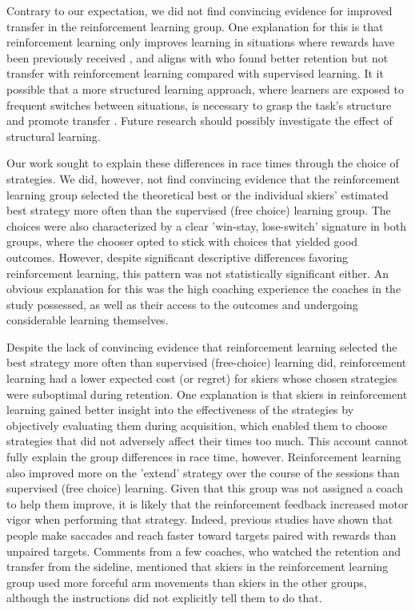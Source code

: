 \documentclass[pdflatex,sn-mathphys-num]{sn-jnl}%
\theoremstyle{thmstyleone}%
\theoremstyle{thmstyletwo}%
\theoremstyle{thmstylethree}%
\begin{document}
Contrary to our expectation, we did not find convincing evidence for improved transfer in the reinforcement learning group. One explanation for this is that reinforcement learning only improves learning in situations where rewards have been previously received \cite{robertson_memory_2018}, and aligns with \textcite{hasson_reinforcement_2015} who found better retention but not transfer with reinforcement learning compared with supervised learning. It it possible that a more structured learning approach, where learners are exposed to frequent switches between situations, is necessary to grasp the task's structure and promote transfer \cite{braun_structure_2010}. Future research should possibly investigate the effect of structural learning. 

Our work sought to explain these differences in race times through the choice of strategies. We did, however, not find convincing evidence that the reinforcement learning group selected the theoretical best or the individual skiers' estimated best strategy more often than the supervised (free choice) learning group. The choices were also characterized by a clear 'win-stay, lose-switch' signature in both groups, where the chooser opted to stick with choices that yielded good outcomes. However, despite significant descriptive differences favoring reinforcement learning, this pattern was not statistically significant either. An obvious explanation for this was the high coaching experience the coaches in the study possessed, as well as their access to the outcomes and undergoing considerable learning themselves. 

Despite the lack of convincing evidence that reinforcement learning selected the best strategy more often than supervised (free-choice) learning did, reinforcement learning had a lower expected cost (or regret) for skiers whose chosen strategies were suboptimal during retention. One explanation is that skiers in reinforcement learning gained better insight into the effectiveness of the strategies by objectively evaluating them during acquisition, which enabled them to choose strategies that did not adversely affect their times too much. This account cannot fully explain the group differences in race time, however. Reinforcement learning also improved more on the 'extend' strategy over the course of the sessions than supervised (free choice) learning. Given that this group was not assigned a coach to help them improve, it is likely that the reinforcement feedback increased motor vigor \cite{shadmehr_vigor_2020, pietro_mazzoni_why_2007, niv_normative_2006} when performing that strategy. Indeed, previous studies have shown that people make saccades \cite{takikawa_modulation_2002} and reach faster \cite{summerside_vigor_2018} toward targets paired with rewards than unpaired targets. Comments from a few coaches, who watched the retention and transfer from the sideline, mentioned that skiers in the reinforcement learning group used more forceful arm movements than skiers in the other groups, although the instructions did not explicitly tell them to do that.
\end{document}
